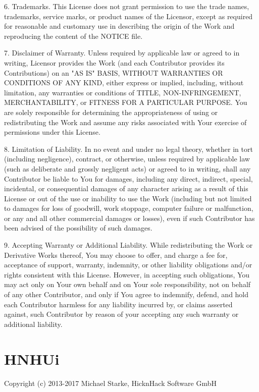 \documentclass[parskip=half]{scrartcl}
\begin{document}
   6. Trademarks. This License does not grant permission to use the trade
      names, trademarks, service marks, or product names of the Licensor,
      except as required for reasonable and customary use in describing the
      origin of the Work and reproducing the content of the NOTICE file.

   7. Disclaimer of Warranty. Unless required by applicable law or
      agreed to in writing, Licensor provides the Work (and each
      Contributor provides its Contributions) on an "AS IS" BASIS,
      WITHOUT WARRANTIES OR CONDITIONS OF ANY KIND, either express or
      implied, including, without limitation, any warranties or conditions
      of TITLE, NON-INFRINGEMENT, MERCHANTABILITY, or FITNESS FOR A
      PARTICULAR PURPOSE. You are solely responsible for determining the
      appropriateness of using or redistributing the Work and assume any
      risks associated with Your exercise of permissions under this License.

   8. Limitation of Liability. In no event and under no legal theory,
      whether in tort (including negligence), contract, or otherwise,
      unless required by applicable law (such as deliberate and grossly
      negligent acts) or agreed to in writing, shall any Contributor be
      liable to You for damages, including any direct, indirect, special,
      incidental, or consequential damages of any character arising as a
      result of this License or out of the use or inability to use the
      Work (including but not limited to damages for loss of goodwill,
      work stoppage, computer failure or malfunction, or any and all
      other commercial damages or losses), even if such Contributor
      has been advised of the possibility of such damages.

   9. Accepting Warranty or Additional Liability. While redistributing
      the Work or Derivative Works thereof, You may choose to offer,
      and charge a fee for, acceptance of support, warranty, indemnity,
      or other liability obligations and/or rights consistent with this
      License. However, in accepting such obligations, You may act only
      on Your own behalf and on Your sole responsibility, not on behalf
      of any other Contributor, and only if You agree to indemnify,
      defend, and hold each Contributor harmless for any liability
      incurred by, or claims asserted against, such Contributor by reason
      of your accepting any such warranty or additional liability.

\section*{HNHUi}
Copyright (c) 2013-2017 Michael Starke, HicknHack Software GmbH
\end{document}
